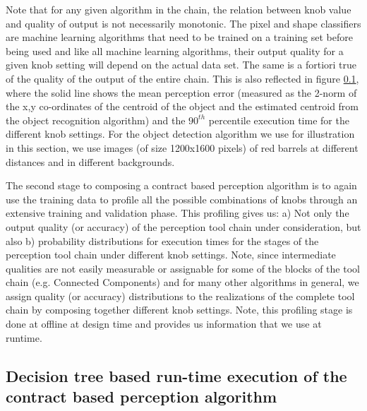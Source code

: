 Note that for any given algorithm in the chain, the relation between knob value and quality of output is not necessarily monotonic. The pixel and shape classifiers are machine learning algorithms that need to be trained on a training set before being used and like all machine learning algorithms, their output quality for a given knob setting will depend on the actual data set.
The same is a fortiori true of the quality of the output of the entire chain. This is also reflected in figure \ref{}, where the solid line shows the mean perception error (measured as the 2-norm of the x,y co-ordinates of the centroid of the object and the estimated centroid from the object recognition algorithm) and the $90^{th}$ percentile execution time for the different knob settings. For the object detection algorithm we use for illustration in this section, we use images (of size 1200x1600 pixels) of red barrels at different distances and in different backgrounds.

The second stage to composing a contract based perception algorithm is to again use the training data to profile all the possible combinations of knobs through an extensive training and validation phase. This profiling gives us: a) Not only the output quality (or accuracy) of the perception tool chain under consideration, but also b) probability distributions for execution times for the stages of the perception tool chain under different knob settings. Note, since intermediate qualities are not easily measurable or assignable for some of the blocks of the tool chain (e.g. Connected Components) and for many other algorithms in general, we assign quality (or accuracy) distributions to the realizations of the complete tool chain by composing together different knob settings. Note, this profiling stage is done at offline at design time and provides us information that we use at runtime.

\subsection{Decision tree based run-time execution of the contract based perception algorithm}


